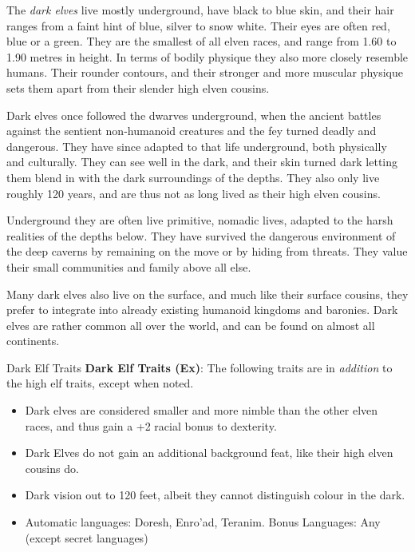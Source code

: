 The \emph{dark elves} live mostly underground, have black to blue skin, and
their hair ranges from a faint hint of blue, silver to snow white. Their eyes
are often red, blue or a green. They are the smallest of all elven races, and
range from 1.60 to 1.90 metres in height. In terms of bodily physique they
also more closely resemble humans. Their rounder contours, and their stronger
and more muscular physique sets them apart from their slender high elven
cousins.

Dark elves once followed the dwarves underground, when the ancient battles
against the sentient non-humanoid creatures and the fey turned deadly and
dangerous. They have since adapted to that life underground, both physically
and culturally. They can see well in the dark, and their skin turned dark
letting them blend in with the dark surroundings of the depths. They also only
live roughly 120 years, and are thus not as long lived as their high elven
cousins.

Underground they are often live primitive, nomadic lives, adapted to the harsh
realities of the depths below. They have survived the dangerous environment of
the deep caverns by remaining on the move or by hiding from threats. They
value their small communities and family above all else.

Many dark elves also live on the surface, and much like their surface cousins,
they prefer to integrate into already existing humanoid kingdoms and baronies.
Dark elves are rather common all over the world, and can be found on almost all
continents.

\begin{35e}{Dark Elf Traits}
  \textbf{Dark Elf Traits (Ex)}: The following traits are in \emph{addition}
  to the high elf traits, except when noted.
  \begin{itemize}[noitemsep]
    \item Dark elves are considered smaller and more nimble than the other
      elven races, and thus gain a +2 racial bonus to dexterity.
    \item Dark Elves do not gain an additional background feat, like their
      high elven cousins do.
    \item Dark vision out to 120 feet, albeit they cannot distinguish colour
      in the dark.
    \item Automatic languages: Doresh, Enro'ad, Teranim. Bonus Languages: Any
      (except secret languages)
  \end{itemize}
\end{35e}

